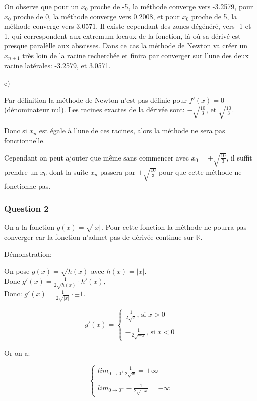 \documentclass{article}
\begin{document}
	On observe que pour un $x_{0}$ proche de -5, la méthode converge vers -3.2579, pour $x_{0}$ proche de 0, la méthode converge vers 0.2008, et pour $x_{0}$ proche de 5, la méthode converge vers 3.0571. Il existe cependant des zones dégénéré, vers -1 et 1, qui correspondent aux extremum locaux de la fonction, là où sa dérivé est presque paralèlle aux abscisses.
	Dans ce cas la méthode de Newton va créer un $x_{n+1}$
	très loin de la racine recherchée et finira par converger sur l'une des deux racine latérales: -3.2579, et 3.0571.
	
	c)
	
	Par définition la méthode de Newton n'est pas définie pour $f'(x)=0$ (dénominateur nul). Les racines exactes de la dérivée sont: $-\sqrt{\frac{10}{3}}$, et $ \sqrt{\frac{10}{3}}$.
	
	Donc si $x_{n}$ est égale à l'une de ces racines, alors la méthode ne sera pas fonctionnelle.
	
	Cependant on peut ajouter que même sans commencer avec $x_{0}= \pm  \sqrt{\frac{10}{3}}$, il suffit prendre un $x_{0}$ dont la suite $x_{n}$ passera par $\pm \sqrt{\frac{10}{3}}$ pour que cette méthode ne fonctionne pas.
	
	\subsubsection{Question 2}
		
	On a la fonction $g(x)=\sqrt{|x|}$.
	Pour cette fonction la méthode ne pourra pas converger car la fonction n'admet pas de dérivée continue sur $\mathbb{R}$.
	
	Démonstration: 
	
	\begin{large}
	\begin{center}
		On pose $g(x)=\sqrt{h(x)}$ avec $h(x)=|x|$.\\
		Donc $g'(x)=\frac{1}{2\sqrt{h(x)}} \cdot h'(x)$,\\
		Donc: $g'(x)=\frac{1}{2\sqrt{|x|}} \cdot \pm 1$.
	
		$$g'(x)=\left\{
			\begin{array}{ll}
				\frac{1}{2\sqrt{x}} \mbox{, si } x > 0 \\ \\
				-\frac{1}{2\sqrt{-x}} \mbox{, si } x < 0				
			\end{array}\right.$$
	
	Or on a:

		$$
		\left\{
			\begin{array}{ll}
				lim_{0 \to 0^{+}}\frac{1}{2\sqrt{x}}=+\infty \\ \\
				lim_{0 \to 0^{-}}-\frac{1}{2\sqrt{-x}}=-\infty
			\end{array}
		\right.
		$$
	\end{center}
	\end{large}	
\end{document}
